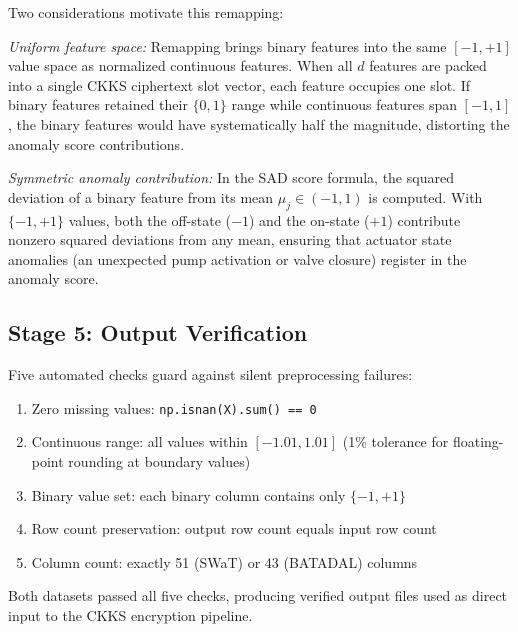 Two considerations motivate this remapping:

\textit{Uniform feature space:} Remapping brings binary features into the same
$[-1, +1]$ value space as normalized continuous features. When all $d$ features
are packed into a single CKKS ciphertext slot vector, each feature occupies one
slot. If binary features retained their $\{0, 1\}$ range while continuous
features span $[-1, 1]$, the binary features would have systematically half the
magnitude, distorting the anomaly score contributions.

\textit{Symmetric anomaly contribution:} In the SAD score formula, the squared
deviation of a binary feature from its mean $\mu_j \in (-1, 1)$ is computed.
With $\{-1, +1\}$ values, both the off-state ($-1$) and the on-state ($+1$)
contribute nonzero squared deviations from any mean, ensuring that actuator
state anomalies (an unexpected pump activation or valve closure) register in
the anomaly score.

\subsection{Stage 5: Output Verification}

Five automated checks guard against silent preprocessing failures:
\begin{enumerate}
  \item Zero missing values: \texttt{np.isnan(X).sum() == 0}
  \item Continuous range: all values within $[-1.01, 1.01]$ (1\% tolerance for
  floating-point rounding at boundary values)
  \item Binary value set: each binary column contains only $\{-1, +1\}$
  \item Row count preservation: output row count equals input row count
  \item Column count: exactly 51 (SWaT) or 43 (BATADAL) columns
\end{enumerate}

Both datasets passed all five checks, producing verified output files used as
direct input to the CKKS encryption pipeline.

